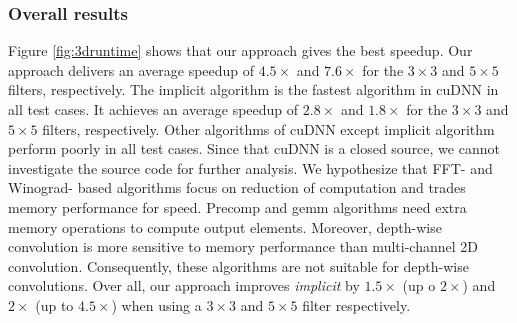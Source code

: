 \subsubsection{Overall results}
Figure \ref{fig:3druntime} shows that our approach gives the best speedup. Our approach delivers an average speedup of $4.5\times$ and
$7.6\times$ for the $3 \times 3$ and $5 \times 5$ filters, respectively. The implicit algorithm is the fastest algorithm in cuDNN in all
test cases. It achieves an average speedup of $2.8\times$ and $1.8\times$ for the $3 \times 3$ and $5 \times 5$ filters, respectively.
Other algorithms of cuDNN except implicit algorithm perform poorly in all test cases. Since that cuDNN is a closed source, we cannot
investigate the source code for further analysis. We hypothesize that FFT- and Winograd- based algorithms focus on reduction of computation
and trades memory performance for speed. Precomp and gemm algorithms need extra memory operations to compute output elements. Moreover,
depth-wise convolution is more sensitive to memory performance than multi-channel 2D convolution. Consequently, these algorithms are not suitable for
depth-wise convolutions. Over all, our approach improves \emph{implicit} by $1.5\times$ (up o $2\times$) and $2\times$ (up to $4.5\times$)
when using a $3 \times 3$ and $5 \times 5$ filter respectively.

%

